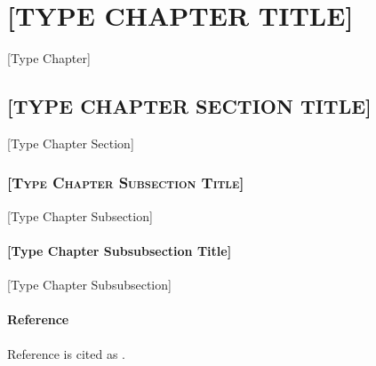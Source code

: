 \chapter{\uppercase{[Type Chapter Title]}}
[Type Chapter]
\section{\uppercase{[Type Chapter Section Title]}}
[Type Chapter Section]
\subsection{\textsc{[Type Chapter Subsection Title]}}
[Type Chapter Subsection]
\subsubsection{[Type Chapter Subsubsection Title]}
[Type Chapter Subsubsection]
\subsubsection{Reference}
Reference is cited as \cite{HP2000}.